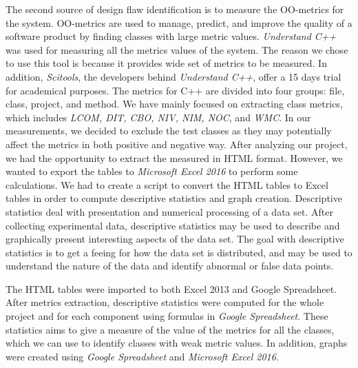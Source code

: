 The second source of design flaw identification is to measure the OO-metrics for the system. OO-metrics are used to manage, predict, and improve the quality of a software product\cite{rodriguez2001overview} by finding classes with large metric values. \textit{Understand C++} was used for measuring all the metrics values of the system. The reason we chose to use this tool is because it provides wide set of metrics to be measured. In addition, \textit{Scitools}, the developers behind \textit{Understand C++}, offer a 15 days trial for academical purposes. The metrics for C++ are divided into four groups: file, class, project, and method. We have mainly focused on extracting class metrics, which includes \textit{LCOM, DIT, CBO, NIV, NIM, NOC}, and \textit{WMC}. In our measurements, we decided to exclude the test classes as they may potentially affect the metrics in both positive and negative way. After analyzing our project, we had the opportunity to extract the measured in HTML format. However, we wanted to export the tables to \textit{Microsoft Excel 2016} to perform some calculations. We had to create a script to convert the HTML tables to Excel tables in order to compute descriptive statistics and graph creation. Descriptive statistics deal with presentation and numerical processing of a data set\cite{Wohlin:2000:ESE:330775}. After collecting experimental data, descriptive statistics may be used to describe and graphically present interesting aspects of the data set. The goal with descriptive statistics is to get a feeing for how the data set is distributed, and may be used to understand the nature of the data and identify abnormal or false data points. 

The HTML tables were imported to both Excel 2013 and Google Spreadsheet. After metrics extraction, descriptive statistics were computed for the whole project and for each component using formulas in \textit{Google Spreadsheet}. These statistics aims to give a measure of the value of the metrics for all the classes, which we can use to identify classes with weak metric values. In addition, graphs were created using \textit{Google Spreadsheet} and \textit{Microsoft Excel 2016}. 


